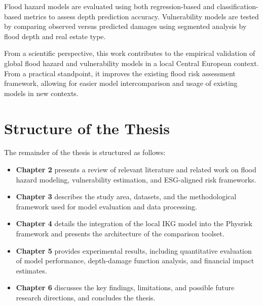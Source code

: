 Flood hazard models are evaluated using both regression-based and classification-based metrics to assess depth prediction accuracy. Vulnerability models are tested by comparing observed versus predicted damages using segmented analysis by flood depth and real estate type.

From a scientific perspective, this work contributes to the empirical validation of global flood hazard and vulnerability models in a local Central European context. From a practical standpoint, it improves the existing flood risk assessment framework, allowing for easier model intercomparison and usage of existing models in new contexts.


\section{Structure of the Thesis}

The remainder of the thesis is structured as follows:

\begin{itemize}
    \item \textbf{Chapter 2} presents a review of relevant literature and related work on flood hazard modeling, vulnerability estimation, and ESG-aligned risk frameworks.
    \item \textbf{Chapter 3} describes the study area, datasets, and the methodological framework used for model evaluation and data processing.
    \item \textbf{Chapter 4} details the integration of the local IKG model into the Physrisk framework and presents the architecture of the comparison toolset.
    \item \textbf{Chapter 5} provides experimental results, including quantitative evaluation of model performance, depth-damage function analysis, and financial impact estimates.
    \item \textbf{Chapter 6} discusses the key findings, limitations, and possible future research directions, and concludes the thesis.
\end{itemize}
